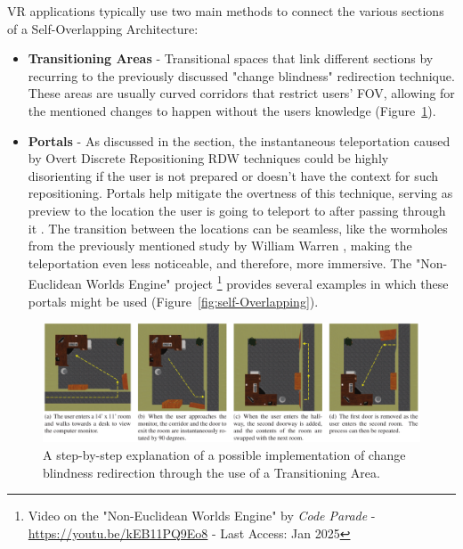 \gls{VR} applications typically use two main methods to connect the various sections of a Self-Overlapping Architecture: 

\begin{itemize}

    \item \textbf{Transitioning Areas} - Transitional spaces that link different sections by recurring to the previously discussed 
    "change blindness" redirection technique. These areas are usually curved corridors that restrict users' \gls{FOV}, 
    allowing for the mentioned changes to happen without the users knowledge \cite{5759455, Vasylevska2017} (Figure~\ref{fig:transioning-areas}).
    
    \item \textbf{Portals} - As discussed in the  section, 
    the instantaneous teleportation caused by Overt Discrete Repositioning \gls{RDW} techniques could be highly disorienting if the user is 
    not prepared or doesn't have the context for such repositioning. Portals help mitigate the overtness of this technique, serving as preview 
    to the location the user is going to teleport to after passing through it \cite{Freitag2014,Lee2018}. The transition between the locations can 
    be seamless, like the wormholes from the previously mentioned study by William Warren \cite{Warren2019}, 
    making the teleportation even less noticeable, and therefore, more immersive. 
    The "Non-Euclidean Worlds Engine" project 
    \footnote{Video on the "Non-Euclidean Worlds Engine" by \textit{Code Parade} - \href{https://youtu.be/kEB11PQ9Eo8}{https://youtu.be/kEB11PQ9Eo8} - Last Access: Jan 2025 }
    provides several examples in which these portals might be used (Figure~\ref{fig:self-Overlapping}).

\end{itemize}

\begin{figure}[b]
    \centering
    \includegraphics[width=\textwidth]{NOVAthesisFiles/Images/papers/transioning-areas.png}
    \caption{A step-by-step explanation of a possible implementation of change blindness redirection through the use of a Transitioning Area. 
    \cite{5759455}}
    \label{fig:transioning-areas}
\end{figure}

